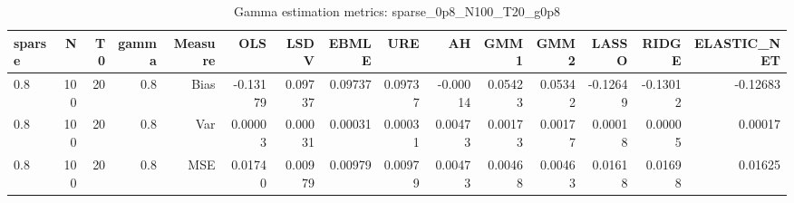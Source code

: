 \begin{table}[!htbp]\centering
\caption{Gamma estimation metrics: sparse_0p8_N100_T20_g0p8}
\label{tab:table1_sparse_0p8_N100_T20_g0p8}
\begin{tabular}{lrrrrrrrrrrrrrr}
\hline
sparse & N & T0 & gamma & Measure & OLS & LSDV & EBMLE & URE & AH & GMM1 & GMM2 & LASSO & RIDGE & ELASTIC_NET \\
\hline
0.8 & 100 & 20 & 0.8 & Bias & -0.13179 & 0.09737 & 0.09737 & 0.09737 & -0.00014 & 0.05423 & 0.05342 & -0.12649 & -0.13012 & -0.12683 \\
0.8 & 100 & 20 & 0.8 & Var & 0.00003 & 0.00031 & 0.00031 & 0.00031 & 0.00473 & 0.00173 & 0.00177 & 0.00018 & 0.00005 & 0.00017 \\
0.8 & 100 & 20 & 0.8 & MSE & 0.01740 & 0.00979 & 0.00979 & 0.00979 & 0.00473 & 0.00468 & 0.00463 & 0.01618 & 0.01698 & 0.01625 \\
\hline
\end{tabular}
\end{table}


